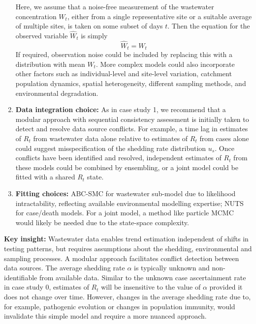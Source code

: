 \documentclass{article}
\begin{document}
\begin{enumerate}
    Here, we assume that a noise-free measurement of the wastewater concentration $W_t$, either from a single representative site or a suitable average of multiple sites, is taken on some subset of days $t$. Then the equation for the observed variable $\hat{W}_t$ is simply
    \begin{equation}
        \hat{W}_t=W_t
    \end{equation}
    If required, observation noise could be included by replacing this with a distribution with mean $W_t$. 
    More complex models could also incorporate other factors such as individual-level and site-level variation, catchment population dynamics, spatial heterogeneity, different sampling methods, and environmental degradation.
    \item \textbf{Data integration choice:} As in case study 1, we recommend that a modular approach with sequential consistency assessment is initially taken to detect and resolve data source conflicts. For example, a time lag in estimates of $R_t$ from wastewater data alone relative to estimates of $R_t$ from cases alone could suggest misspecification of the shedding rate distribution $u_s$. Once conflicts have been identified and resolved, independent estimates of $R_t$ from these models could be combined by ensembling, or a joint model could be fitted with a shared $R_t$ state. 
    \item \textbf{Fitting choices:} ABC-SMC for wastewater sub-model due to likelihood intractability, reflecting available environmental modelling expertise; NUTS for case/death models. For a joint model, a method like particle MCMC would likely be needed due to the state-space complexity.
\end{enumerate}

\textbf{Key insight:} Wastewater data enables trend estimation independent of shifts in testing patterns, but requires assumptions about the shedding, environmental and sampling processes. A modular approach facilitates conflict detection between data sources. The average shedding rate $\alpha$ is typically unknown and non-identifiable from available data. Similar to the unknown case ascertainment rate in case study 0, estimates of $R_t$ will be insensitive to the value of $\alpha$ provided it does not change over time. However, changes in the average shedding rate due to, for example, pathogenic evolution or changes in population immunity, would invalidate this simple model and require a more nuanced approach.  
\end{document}
